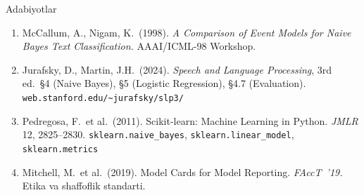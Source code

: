 \documentclass[aspectratio=169,11pt]{beamer}
\begin{document}
\begin{frame}{Adabiyotlar}
  \small
  \begin{enumerate}\setlength{\itemsep}{5pt}
    \item McCallum, A., Nigam, K.\ (1998).
          \textit{A Comparison of Event Models for Naive Bayes
          Text Classification.} AAAI/ICML-98 Workshop.

    \item Jurafsky, D., Martin, J.H.\ (2024).
          \textit{Speech and Language Processing}, 3rd ed.\
          \S4 (Naive Bayes), \S5 (Logistic Regression),
          \S4.7 (Evaluation).
          \textcolor{halfgray}{\footnotesize
            \texttt{web.stanford.edu/\textasciitilde jurafsky/slp3/}}

    \item Pedregosa, F.\ et al.\ (2011).
          Scikit-learn: Machine Learning in Python.
          \textit{JMLR} 12, 2825--2830.
          \textcolor{halfgray}{\footnotesize
            \texttt{sklearn.naive\_bayes},
            \texttt{sklearn.linear\_model},
            \texttt{sklearn.metrics}}

    \item Mitchell, M.\ et al.\ (2019).
          Model Cards for Model Reporting.
          \textit{FAccT~'19.}
          \textcolor{halfgray}{\footnotesize
            Etika va shaffoflik standarti.}
  \end{enumerate}
\end{frame}

\appendix
\end{document}
